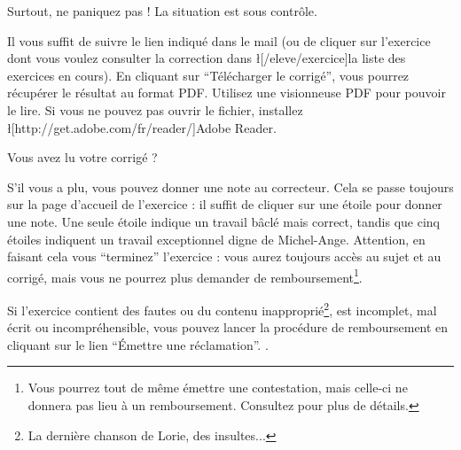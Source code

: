 ﻿Surtout, ne paniquez pas ! La situation est sous contrôle.

Il vous suffit de suivre le lien indiqué dans le mail (ou de cliquer sur l’exercice dont vous voulez consulter la correction dans  \l[/eleve/exercice]{la liste des exercices en cours}).
En cliquant sur “Télécharger le corrigé”, vous pourrez récupérer le résultat au format PDF. Utilisez une visionneuse PDF pour pouvoir le lire. Si vous ne pouvez pas ouvrir le fichier, installez \l[http://get.adobe.com/fr/reader/]{Adobe Reader}.

Vous avez lu votre corrigé ?
\item S’il vous a plu, vous pouvez donner une note au correcteur. Cela se passe toujours sur la page d’accueil de l’exercice : il suffit de cliquer sur une étoile pour donner une note. Une seule étoile indique un travail bâclé mais correct, tandis que cinq étoiles indiquent un travail exceptionnel digne de Michel-Ange. Attention, en faisant cela vous “terminez” l’exercice : vous aurez toujours accès au sujet et au corrigé, mais vous ne pourrez plus demander de remboursement\footnote{Vous pourrez tout de même émettre une contestation, mais celle-ci ne donnera pas lieu à un remboursement. Consultez  pour plus de détails.}.
\item Si l’exercice contient des fautes ou du contenu inapproprié\footnote{La dernière chanson de Lorie, des insultes...}, est incomplet, mal écrit ou incompréhensible, vous pouvez lancer la procédure de remboursement en cliquant sur le lien “Émettre une réclamation”. .